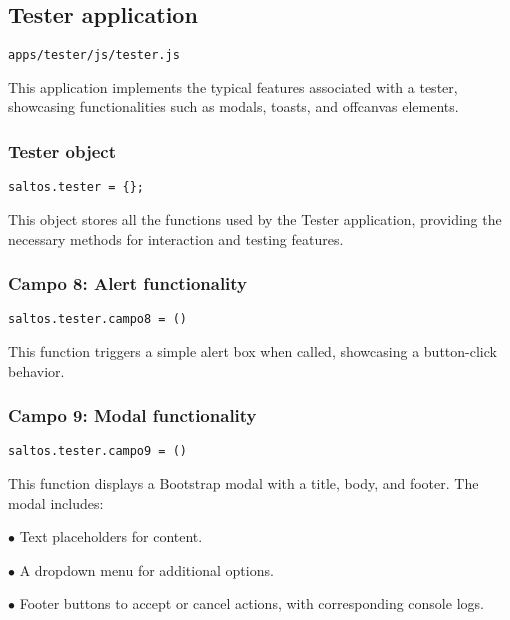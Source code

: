 \documentclass[a4paper]{article}
\begin{document}
\hypertarget{toc168}{}
\subsection{Tester application}

\begin{lstlisting}
apps/tester/js/tester.js
\end{lstlisting}

This application implements the typical features associated with a tester,
showcasing functionalities such as modals, toasts, and offcanvas elements.

\hypertarget{toc169}{}
\subsubsection{Tester object}

\begin{lstlisting}
saltos.tester = {};
\end{lstlisting}

This object stores all the functions used by the Tester application,
providing the necessary methods for interaction and testing features.

\hypertarget{toc170}{}
\subsubsection{Campo 8: Alert functionality}

\begin{lstlisting}
saltos.tester.campo8 = ()
\end{lstlisting}

This function triggers a simple alert box when called, showcasing a button-click behavior.

\hypertarget{toc171}{}
\subsubsection{Campo 9: Modal functionality}

\begin{lstlisting}
saltos.tester.campo9 = ()
\end{lstlisting}

This function displays a Bootstrap modal with a title, body, and footer. The modal includes:

\begin{compactitem}
\item[\color{myblue}$\bullet$] Text placeholders for content.
\item[\color{myblue}$\bullet$] A dropdown menu for additional options.
\item[\color{myblue}$\bullet$] Footer buttons to accept or cancel actions, with corresponding console logs.
\end{compactitem}
\end{document}
